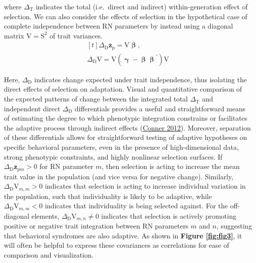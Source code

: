 \documentclass{article}
\begin{document}
where \(\Delta_{\mathrm{T}}\) indicates the total (i.e.~direct and
indirect) within-generation effect of selection. We can also consider
the effects of selection in the hypothetical case of complete
independence between RN parameters by instead using a diagonal matrix
\(\boldsymbol{\mathrm{V}}=\boldsymbol{\mathrm{S}}^2\) of trait
variances. \begin{equation} \tag{4.2}\label{eq:4.2}
\begin{gathered}[t]
\Delta_{\mathrm{D}}\bar{\boldsymbol{z}}_{\boldsymbol{\mathrm{p}}} =
\boldsymbol{\mathrm{V}} \boldsymbol{\upbeta}, \\ 
\Delta_{\mathrm{D}} \boldsymbol{\mathrm{V}} = \boldsymbol{\mathrm{V}} \left( \boldsymbol{\upgamma} - \boldsymbol{ \upbeta \upbeta }^{'} \right) \boldsymbol{\mathrm{V}} \nonumber
\end{gathered}
\end{equation}

Here, \(\Delta_{\mathrm{D}}\) indicates change expected under trait
independence, thus isolating the direct effects of selection on
adaptation. Visual and quantitative comparison of the expected patterns
of change between the integrated total \(\Delta_{\mathrm{T}}\) and
independent direct \(\Delta_{\mathrm{D}}\) differentials provides a
useful and straightforward means of estimating the degree to which
phenotypic integration constrains or facilitates the adaptive process
through indirect effects (\protect\hyperlink{ref-Conner2012}{Conner
2012}). Moreover, separation of these differentials allows for
straightforward testing of adaptive hypotheses on specific behavioral
parameters, even in the presence of high-dimensional data, strong
phenotypic constraints, and highly nonlinear selection surfaces. If
\(\Delta_{\mathrm{D}} \bar{\boldsymbol{z}}_{\boldsymbol{\mathrm{p}}m} > 0\)
for RN parameter \(m\), then selection is acting to increase the mean
trait value in the population (and vice versa for negative change).
Similarly, \(\Delta_{\mathrm{D}} \boldsymbol{\mathrm{V}}_{m,m} > 0\)
indicates that selection is acting to increase individual variation in
the population, such that individuality is likely to be adaptive, while
\(\Delta_{\mathrm{D}} \boldsymbol{\mathrm{V}}_{m,m} < 0\) indicates that
individuality is being selected against. For the off-diagonal elements,
\(\Delta_{\mathrm{D}} \boldsymbol{\mathrm{V}}_{m,n} \neq 0\) indicates
that selection is actively promoting positive or negative trait
integration between RN parameters \(m\) and \(n\), suggesting that
behavioral syndromes are also adaptive. As shown in \textbf{Figure
\ref{fig:fig3}}, it will often be helpful to express these covariances
as correlations for ease of comparison and visualization.
\end{document}

